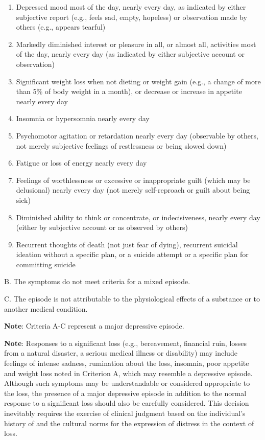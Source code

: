\documentclass[
]{article}
\begin{document}
\begin{enumerate}
\def\labelenumi{\arabic{enumi}.}
\item
  Depressed mood most of the day, nearly every day, as indicated by
  either subjective report (e.g., feels sad, empty, hopeless) or
  observation made by others (e.g., appears tearful)
\item
  Markedly diminished interest or pleasure in all, or almost all,
  activities most of the day, nearly every day (as indicated by either
  subjective account or observation)
\item
  Significant weight loss when not dieting or weight gain (e.g., a
  change of more than 5\% of body weight in a month), or decrease or
  increase in appetite nearly every day
\item
  Insomnia or hypersomnia nearly every day
\item
  Psychomotor agitation or retardation nearly every day (observable by
  others, not merely subjective feelings of restlessness or being slowed
  down)
\item
  Fatigue or loss of energy nearly every day
\item
  Feelings of worthlessness or excessive or inappropriate guilt (which
  may be delusional) nearly every day (not merely self-reproach or guilt
  about being sick)
\item
  Diminished ability to think or concentrate, or indecisiveness, nearly
  every day (either by subjective account or as observed by others)
\item
  Recurrent thoughts of death (not just fear of dying), recurrent
  suicidal ideation without a specific plan, or a suicide attempt or a
  specific plan for committing suicide
\end{enumerate}

B. The symptoms do not meet criteria for a mixed episode.

C. The episode is not attributable to the physiological effects of a
substance or to another medical condition.

\textbf{Note}: Criteria A-C represent a major depressive episode.

\textbf{Note}: Responses to a significant loss (e.g., bereavement,
financial ruin, losses from a natural disaster, a serious medical
illness or disability) may include feelings of intense sadness,
rumination about the loss, insomnia, poor appetite and weight loss noted
in Criterion A, which may resemble a depressive episode. Although such
symptoms may be understandable or considered appropriate to the loss,
the presence of a major depressive episode in addition to the normal
response to a significant loss should also be carefully considered. This
decision inevitably requires the exercise of clinical judgment based on
the individual's history of and the cultural norms for the expression of
distress in the context of loss.
\end{document}
